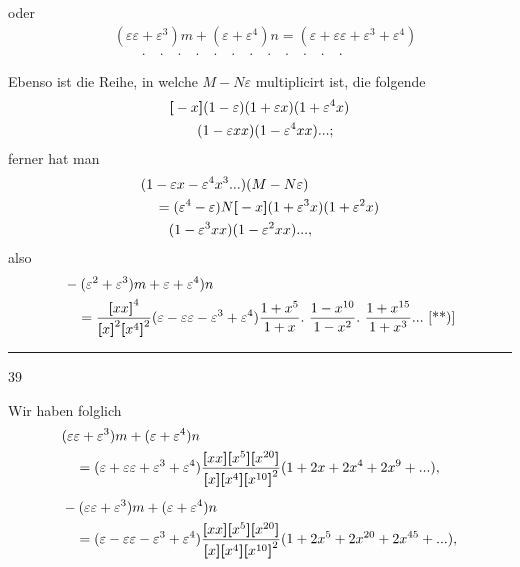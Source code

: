 \noindent oder
\[\begin{aligned}
&(\varepsilon\varepsilon+\varepsilon^3)m+(\varepsilon+\varepsilon^4)n=(\varepsilon+\varepsilon\varepsilon+\varepsilon^3+\varepsilon^4)\\
&\qquad{.}\quad{.}\quad{.}\quad{.}\quad{.}\quad{.}\quad{.}\quad{.}\quad{.}\quad{.}\quad{.}\quad{.}
\end{aligned}\]
\noindent [S. 50]
\par\indent Ebenso ist die Reihe, in welche $M-N\varepsilon$ multiplicirt ist, die folgende
\[\begin{aligned}
&\boldsymbol{[}-x\boldsymbol{]}(1-\varepsilon)(1+\varepsilon x)(1+\varepsilon^4x)\\
&\qquad(1-\varepsilon xx)(1-\varepsilon^4xx){.}{.}{.};
\end{aligned}\]
\noindent ferner hat man
\[\begin{aligned}
&(1-\varepsilon x-\varepsilon^4x^3{.}{.}{.})(M-N\varepsilon)\\
&\quad=(\varepsilon^4-\varepsilon)N\boldsymbol{[}-x\boldsymbol{]}(1+\varepsilon^3x)(1+\varepsilon^2x)\\
&\qquad(1-\varepsilon^3xx)(1-\varepsilon^2xx){.}{.}{.},
\end{aligned}\]
\noindent also
\[\begin{aligned}
&-(\varepsilon^2+\varepsilon^3)m+\varepsilon+\varepsilon^4)n\\
&\quad=\frac{\TransBracket{xx}^4}{\TransBracket{x}^2\TransBracket{x^4}^2}(\varepsilon-\varepsilon\varepsilon-\varepsilon^3+\varepsilon^4)\frac{1+x^5}{1+x}.\ \frac{1-x^{10}}{1-x^2}.\ \frac{1+x^{15}}{1+x^3}{.}{.}{.}\ \text{[**)]}
\end{aligned}\]
\par\smallskip\noindent\rule{.25\linewidth}{.4pt}\par
{\small
\par{}
\par{}
\par}
\par\medskip{}\hfill39
\clearpage
{}
\par\indent Wir haben folglich
\[\begin{aligned}
&(\varepsilon\varepsilon+\varepsilon^3)m+(\varepsilon+\varepsilon^4)n\\
&\quad=(\varepsilon+\varepsilon\varepsilon+\varepsilon^3+\varepsilon^4)\frac{\boldsymbol{[}xx\boldsymbol{]}\boldsymbol{[}x^5\boldsymbol{]}\boldsymbol{[}x^{20}\boldsymbol{]}}{\boldsymbol{[}x\boldsymbol{]}\boldsymbol{[}x^4\boldsymbol{]}\boldsymbol{[}x^{10}\boldsymbol{]}^2}(1+2x+2x^4+2x^9+{.}{.}{.}),\\[5pt]
&-(\varepsilon\varepsilon+\varepsilon^3)m+(\varepsilon+\varepsilon^4)n\\
&\quad=(\varepsilon-\varepsilon\varepsilon-\varepsilon^3+\varepsilon^4)\frac{\boldsymbol{[}xx\boldsymbol{]}\boldsymbol{[}x^5\boldsymbol{]}\boldsymbol{[}x^{20}\boldsymbol{]}}{\boldsymbol{[}x\boldsymbol{]}\boldsymbol{[}x^4\boldsymbol{]}\boldsymbol{[}x^{10}\boldsymbol{]}^2}(1+2x^5+2x^{20}+2x^{45}+{.}{.}{.}),
\end{aligned}\]
